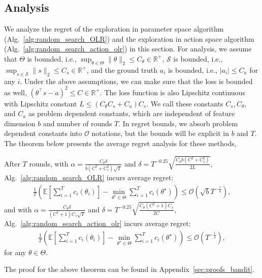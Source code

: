 \subsection{Analysis}
We analyze the regret of the exploration in parameter space algorithm (Alg.~\ref{alg:random_search_OLR}) and the exploration in action space algorithm (Alg.~\ref{alg:random_search_action_olr}) in this section. For analysis, we assume that $\Theta$ is bounded, i.e., $\sup_{\theta\in\Theta}\|\theta\|_2 \leq C_{\theta}\in\mathbb{R}^+$, $\mathcal{S}$ is bounded, i.e., $\sup_{s\in\mathcal{S}}\|s\|_2 \leq C_s\in\mathbb{R}^+$, and the ground truth $a_i$ is bounded, i.e., $|a_i|\leq C_{a}$ for any $i$. Under the above assumptions, we can make sure that the loss is bounded as well, $(\theta^{\top}s - a)^2 \leq C\in\mathbb{R}^{+}$. The loss function is also Lipschitz continuous with Lipschitz constant $L \leq (C_{\theta}C_{s} + C_{a})C_{s}$. We call these constants $C_{s}, C_{\theta}$, and $C_{a}$ as problem dependent constants, which are independent of feature dimension $b$ and number of rounds $T$.
%
In regret bounds, we absorb problem dependent constants into $\mathcal{O}$ notations, but the bounds will be explicit in $b$ and $T$. The theorem below presents the average regret analysis for these methods,

\begin{theorem}
After $T$ rounds, %
%
%
%
%
with $\alpha = \frac{{C_{\theta}}\delta}{b(C^2+C_{s}^2)\sqrt{T}}$ and $\delta = T^{-0.25}\sqrt{\frac{C_{\theta}b(C^2+C_{s}^2)}{2L}}$, Alg.~\ref{alg:random_search_OLR} incurs average regret:
\begin{align}
\label{eq:random_para}
    \frac{1}{T}(\mathbb{E}[\sum_{i=1}^T c_i(\theta_i)] - \min_{\theta^\star
  \in \Theta}\sum_{i=1}^T c_i(\theta^\star)) \leq %
    \mathcal{O}(\sqrt{b}T^{-\frac{1}{4}}),
\end{align}
and with $\alpha = \frac{C_{\theta}\delta}{(C^2+1)C_{s}\sqrt{T}}$ and $\delta = T^{-0.25}\sqrt{\frac{C_{\theta}(C^2+1)C_{s}}{2C}}$, Alg.~\ref{alg:random_search_action_olr} incurs average regret:
\begin{align}
\label{eq:random_action}
    \frac{1}{T}(\mathbb{E}[\sum_{i=1}^T c_i(\theta_i)] -
  \min_{\theta^\star \in \Theta}\sum_{i=1}^T c_i(\theta^\star)) \leq %
    \mathcal{O}(T^{-\frac{1}{4}}),
\end{align} for any $\theta\in\Theta$.
\label{thm:online_linear_regression}
\end{theorem}

The proof for the above theorem can be found in Appendix~\ref{sec:proofs_bandit}.

